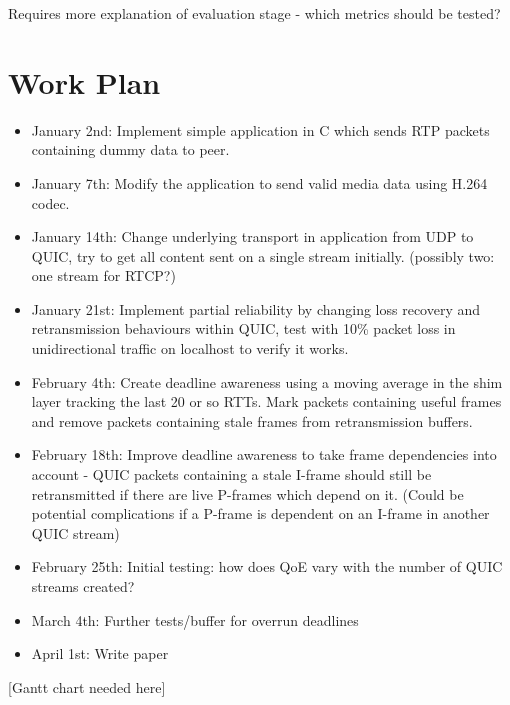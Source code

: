 \documentclass{mprop}
\begin{document}
Requires more explanation of evaluation stage - which metrics should be tested?

\newpage

\section{Work Plan}


\begin{itemize}
  \item January 2nd: Implement simple application in C which sends RTP packets containing dummy 
  data to peer.
  \item January 7th: Modify the application to send valid media data using H.264 codec.
  \item January 14th: Change underlying transport in application from UDP to QUIC, try to get all 
  content sent on a single stream initially. (possibly two: one stream for RTCP?)
  \item January 21st: Implement partial reliability by changing loss recovery and retransmission 
  behaviours within QUIC, test with 10\% packet loss in unidirectional traffic on localhost to 
  verify it works.
  \item February 4th: Create deadline awareness using a moving average in the shim layer tracking 
  the last 20 or so RTTs. Mark packets containing useful frames and remove packets containing 
  stale frames from retransmission buffers.
  \item February 18th: Improve deadline awareness to take frame dependencies into account - QUIC 
  packets containing a stale I-frame should still be retransmitted if there are live P-frames 
  which depend on it. (Could be potential complications if a P-frame is dependent on an I-frame 
  in another QUIC stream)
  \item February 25th: Initial testing: how does QoE vary with the number of QUIC streams created?
  \item March 4th: Further tests/buffer for overrun deadlines
  \item April 1st: Write paper
\end{itemize}

[Gantt chart needed here]

\newpage



\end{document}
